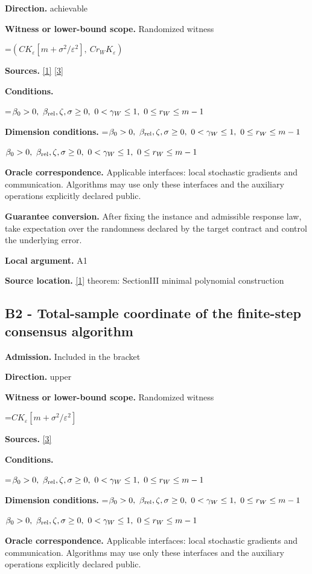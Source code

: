 \documentclass[10pt,a4paper]{article}
\newcommand{\AtlasMath}[1]{\par\begingroup\centering\setbox0=\hbox{$\displaystyle #1$}\ifdim\wd0>1.4\linewidth\typeout{ATLAS WIDE FORMULA: \the\wd0}\fi\ifdim\wd0>\linewidth\resizebox{\linewidth}{!}{\box0}\else\box0\fi\par\endgroup}
\newcommand{\AtlasInlineMath}[1]{\begingroup\setbox0=\hbox{$#1$}\ifdim\wd0>.4\linewidth\endgroup\AtlasMath{#1}\else\endgroup$#1$\fi}
\begin{document}
\textbf{Direction.} achievable

\textbf{Witness or lower-bound scope.} Randomized witness

\AtlasMath{(CK_\varepsilon[m+\sigma^2/\varepsilon^2],\ Cr_WK_\varepsilon)}
\textbf{Sources.} \href{https://engineering.purdue.edu/~sundara2/papers/acc07_distcon.pdf}{[1]} \href{https://arxiv.org/pdf/2509.08726}{[3]}

\textbf{Conditions.} 
\AtlasMath{\beta_0>0,\ \beta_{\rm rel},\zeta,\sigma\ge0,\ 0<\gamma_W\le1,\ 0\le r_W\le m-1}


\textbf{Dimension conditions.} \AtlasInlineMath{\beta_0>0,\ \beta_{\rm rel},\zeta,\sigma\ge0,\ 0<\gamma_W\le1,\ 0\le r_W\le m-1}

\textbf{Oracle correspondence.} Applicable interfaces: local stochastic gradients and communication. Algorithms may use only these interfaces and the auxiliary operations explicitly declared public.

\textbf{Guarantee conversion.} After fixing the instance and admissible response law, take expectation over the randomness declared by the target contract and control the underlying error.

\textbf{Local argument.} A1

\textbf{Source location.} \href{https://engineering.purdue.edu/~sundara2/papers/acc07_distcon.pdf}{[1]} theorem: SectionIII minimal polynomial construction

\subsection{B2 - Total-sample coordinate of the finite-step consensus algorithm}
\textbf{Admission.} Included in the bracket

\textbf{Direction.} upper

\textbf{Witness or lower-bound scope.} Randomized witness

\AtlasMath{CK_\varepsilon[m+\sigma^2/\varepsilon^2]}
\textbf{Sources.} \href{https://arxiv.org/pdf/2509.08726}{[3]}

\textbf{Conditions.} 
\AtlasMath{\beta_0>0,\ \beta_{\rm rel},\zeta,\sigma\ge0,\ 0<\gamma_W\le1,\ 0\le r_W\le m-1}


\textbf{Dimension conditions.} \AtlasInlineMath{\beta_0>0,\ \beta_{\rm rel},\zeta,\sigma\ge0,\ 0<\gamma_W\le1,\ 0\le r_W\le m-1}

\textbf{Oracle correspondence.} Applicable interfaces: local stochastic gradients and communication. Algorithms may use only these interfaces and the auxiliary operations explicitly declared public.
\end{document}
